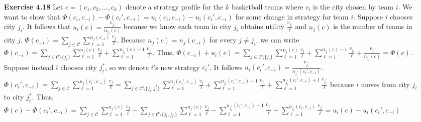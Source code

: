\documentclass[10pt]{article}[H]
\begin{document}
\begin{itemize}
\begin{table}[H]
\begin{tabular}{llll}
        \end{tabular}
        \end{table}
    \item [\textbf{Exercise 4.18}] Let $c=(c_1,c_2,\ldots,c_k)$ denote a strategy profile for the $k$ basketball teams where $c_i$ is the city chosen by team $i$. 
    We want to show that $\Phi(c_i,c_{-i})-\Phi(c_i',c_{-i})=u_i(c_i,c_{-i})-u_i(c_i',c_{-i})$ for some change in strategy for team $i$.
    Suppose $i$ chooses city $j_i$. It follows that $u_i(c)=\frac{v_{j_i}}{n_{j_i}(c)}$ because we know each team in city $j_i$ obtains utility $\frac{v_{j_i}}{\ell}$  and $n_j(c)$ is the number of teams in city $j$. $\Phi(c_{-i})=\displaystyle\sum_{j\in\mathcal{C}}\sum_{\ell=1}^{n_{j}(c_{-i})}\frac{v_j}{\ell}$. Because $n_{j}(c)=n_j(c_{-i})$ for every $j\neq j_i$, we can write $\Phi(c_{-i})=\displaystyle\sum_{j\in\mathcal{C}\setminus\{j_i\}}\sum_{\ell=1}^{n_{j}(c)}\frac{v_j}{\ell}+\sum_{\ell=1}^{n_{j_i}(c)-1}\frac{v_{j_i}}{\ell}$. Thus, $\Phi(c_{-i})+u_i(c)=\displaystyle\sum_{j\in\mathcal{C}\setminus\{j_i\}}\sum_{\ell=1}^{n_{j}(c)}\frac{v_j}{\ell}+\sum_{\ell=1}^{n_{j_i}(c)-1}\frac{v_{j_i}}{\ell}+\frac{v_{j_i}}{n_{j_i}(c)}=\Phi(c)$.
    Suppose instead $i$ chooses city $j_i^*$, so we denote $i$'s new strategy $c_i'$. It follows $u_i(c_i',c_{-i})=\frac{v_{j_i^*}}{n_{j_i^*}(c_i',c_{-i})}$.
    $\Phi(c_i',c_{-i})=\displaystyle\sum_{j\in\mathcal{C}}\sum_{\ell=1}^{n_j(c_i',c_{-i})}\frac{v_j}{\ell}=\sum_{j\in\mathcal{C}\setminus\{j_i,j_i^*\}}\sum_{\ell=1}^{n_j(c_i',c_{-i})}\frac{v_j}{\ell}+\sum_{\ell=1}^{n_{j_i}(c_i',c_{-i})-1}\frac{v_{j_i}}{\ell}+\sum_{\ell=1}^{n_{j_i^*}(c_i',c_{-i})+1}\frac{v_{j_i^*}}{\ell}$ because $i$ moves from city $j_i$ to city $j_i^*$.
    Thus, $\Phi(c)-\Phi(c_i',c_{-i})=\displaystyle\sum_{j\in\mathcal{C}}\sum_{\ell=1}^{n_j(c)}\frac{v_j}{\ell}-\sum_{j\in\mathcal{C}\setminus\{j_i,j_{i^*}\}}\sum_{\ell=1}^{n_j(c)}\frac{v_j}{\ell}-\sum_{\ell=1}^{n_{j_i^*}(c_i',c_{-i})+1}\frac{v_{j_i^*}}{\ell}+\sum_{\ell=1}^{n_{j_i}(c_i,c_{-i})}\frac{v_{j_i}}{\ell}=u_i(c)-u_i(c_i',c_{-i})$
 

\end{itemize}
\end{document}
